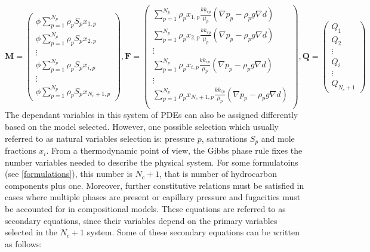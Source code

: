 \begin{equation}
	\mathbf{M} = 
\begin{pmatrix}
	\phi\sum_{p=1}^{N_{p}}\rho_{p}S_{p}x_{1,p} \\
	\phi\sum_{p=1}^{N_{p}}\rho_{p}S_{p}x_{2,p} \\
	\vdots\\
	\phi\sum_{p=1}^{N_{p}}\rho_{p}S_{p}x_{i,p} \\
	\vdots\\
	\phi\sum_{p=1}^{N_{p}}\rho_{p}S_{p}x_{N_{c}+1,p} 
\end{pmatrix}
,\mathbf{F} = 
\begin{pmatrix}
	\sum_{p=1}^{N_{p}}\rho_{p}x_{1,p}\frac{kk_{rp}}{\mu_{p}}(\nabla p_{p}-\rho_{p}g\nabla d)\\
	\sum_{p=1}^{N_{p}}\rho_{p}x_{2,p}\frac{kk_{rp}}{\mu_{p}}(\nabla p_{p}-\rho_{p}g\nabla d)\\
	\vdots\\
	\sum_{p=1}^{N_{p}}\rho_{p}x_{i,p}\frac{kk_{rp}}{\mu_{p}}(\nabla p_{p}-\rho_{p}g\nabla d)\\
	\vdots\\
	\sum_{p=1}^{N_{p}}\rho_{p}x_{N_{c} + 1,p}\frac{kk_{rp}}{\mu_{p}}(\nabla p_{p}-\rho_{p}g\nabla d)\\
\end{pmatrix}
,\mathbf{Q} = 
\begin{pmatrix}
	Q_{1}\\
	Q_{2}\\
	\vdots\\
	Q_{i}\\
	\vdots\\
	Q_{N_{c}+1}
\end{pmatrix}
\end{equation}
The dependant variables in this system of PDEs can also be assigned differently based on the model selected. However, one possible selection which usually referred to as natural variables selection\supercite{cao} is: 
pressure $p$, saturations $S_{p}$ and mole fractions $x_{i}$. From a thermodynamic point of view, the Gibbs phase rule fixes the number variables needed to describe the physical system. For some formulatoins (see \ref{formulations}), this number is 
$N_{c} + 1$, that is number of hydrocarbon components plus one\supercite{cao}. Moreover, further constitutive relations must be satisfied in cases where multiple phases are present or capillary pressure and fugacities must be accounted for in
compositional models. These equations are referred to as secondary equations, since their variables depend on the primary variables selected in the $N_{c} + 1$ system. Some of these secondary equations can be written as follows:

